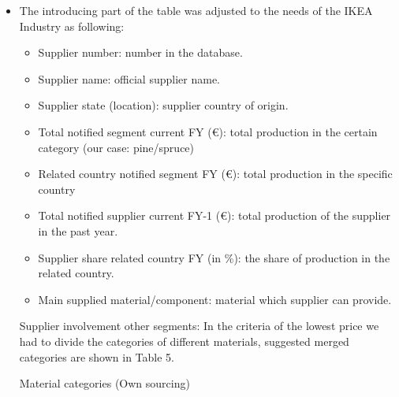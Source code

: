 \documentclass[oneside,12pt]{article}%
\begin{document}
\begin{itemize}
\begin{table}
{{    }
    }
  \end{table}



  \item The introducing part of the table was adjusted to the needs of the IKEA Industry as following:

    \begin{itemize}
      \item Supplier number: number in the database.
      \item Supplier name: official supplier name.
      \item Supplier state (location): supplier country of origin.
      \item Total notified segment current FY (\euro): total production in the certain category (our case: pine/spruce)
      \item Related country notified segment FY (\euro): total production in the specific country
      \item Total notified supplier current FY-1 (\euro): total production of the supplier in the past year.
      \item Supplier share related country FY (in \%): the share of production in the related country.
      \item Main supplied material/component: material which supplier can provide.
    \end{itemize}
    Supplier involvement other segments:
    In the criteria of the lowest price we had to divide the categories of different materials, suggested merged categories are shown in Table 5.


    \begin{table}[h]
      \centering
      \caption{Material categories (Own sourcing)}


\end{table}
\end{itemize}
\end{document}
